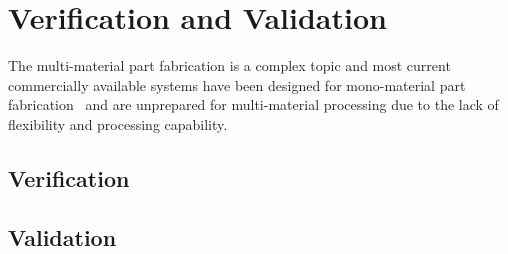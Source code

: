 \chapter{Verification and Validation}%
\label{ch:Validation}
  The multi-material part fabrication is a complex topic and most current
  commercially available systems have been designed for mono-material part
  fabrication~\cite{wohlers2011wohlers} and are unprepared for multi-material
  processing due to the lack of flexibility and processing capability.
%
\section{Verification}%
\label{sec:verification}
% 
%
\section{Validation}%
\label{sec:validation}
% 
%
%
